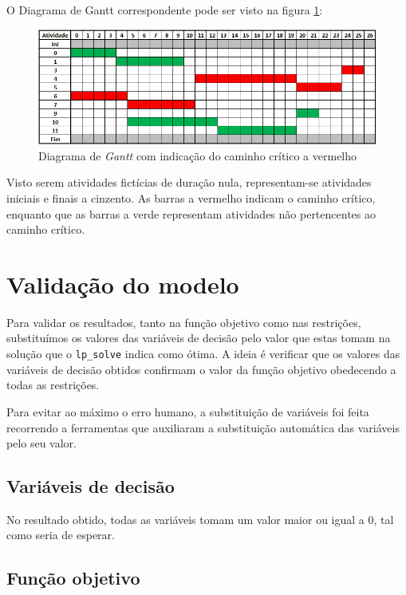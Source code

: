 O Diagrama de Gantt correspondente pode ser visto na figura \ref{p2:fig:diagrama_gantt_caminho_crit}:

\begin{figure}[<+htpb+>] \centering
	\includegraphics[width=\textwidth]{./img/p2_diagrama_gantt_caminho_crit}
	\caption{Diagrama de \emph{Gantt} com indicação do caminho crítico a vermelho}
\label{p2:fig:diagrama_gantt_caminho_crit} \end{figure}

Visto serem atividades fictícias de duração nula, representam-se atividades
iniciais e finais a cinzento. As barras a vermelho indicam o caminho crítico,
enquanto que as barras a verde representam atividades não pertencentes ao
caminho crítico.

\section{Validação do modelo}

Para validar os resultados, tanto na função objetivo como nas restrições,
substituímos os valores das variáveis de decisão pelo valor que estas tomam na
solução que o \texttt{lp\_solve} indica como ótima. A ideia é verificar que os valores das
variáveis de decisão obtidos confirmam o valor da função objetivo obedecendo
a todas as restrições.

Para evitar ao máximo o erro humano, a substituição de variáveis foi feita
recorrendo a ferramentas que auxiliaram a substituição automática das variáveis
pelo seu valor.

\subsection{Variáveis de decisão}

No resultado obtido, todas as variáveis tomam um valor maior ou igual a 0, tal
como seria de esperar.

\subsection{Função objetivo}


